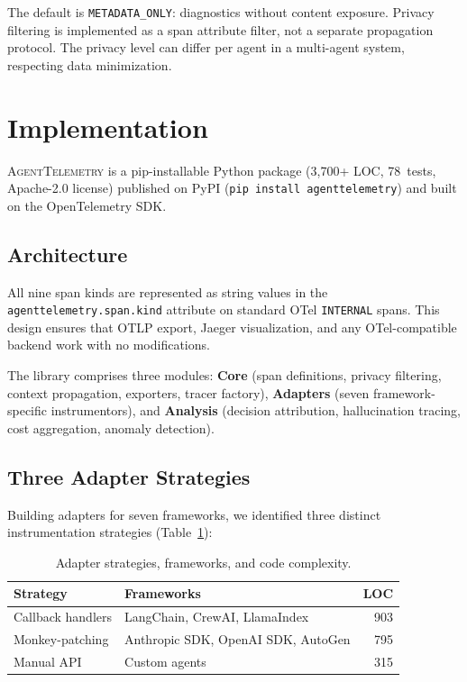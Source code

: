 \documentclass[sigplan,10pt,screen]{acmart}
\begin{document}
The default is \texttt{METADATA\_ONLY}: diagnostics without content
exposure.  Privacy filtering is implemented as a span attribute filter,
not a separate propagation protocol.  The privacy level can differ per
agent in a multi-agent system, respecting data minimization.

\section{Implementation}
\label{sec:implementation}

\textsc{AgentTelemetry} is a pip-installable Python package (3{,}700+
LOC, 78~tests, Apache-2.0 license) published on PyPI
(\texttt{pip install agenttelemetry}) and built on the OpenTelemetry SDK.

\subsection{Architecture}

All nine span kinds are represented as string values in the
\texttt{agenttelemetry.span.kind} attribute on standard OTel
\texttt{INTERNAL} spans.  This design ensures that OTLP export,
Jaeger visualization, and any OTel-compatible backend work with no
modifications.

The library comprises three modules: \textbf{Core} (span definitions,
privacy filtering, context propagation, exporters, tracer factory),
\textbf{Adapters} (seven framework-specific instrumentors), and
\textbf{Analysis} (decision attribution, hallucination tracing, cost
aggregation, anomaly detection).

\subsection{Three Adapter Strategies}

Building adapters for seven frameworks, we identified three distinct
instrumentation strategies (Table~\ref{tab:adapters}):

\begin{table}[t]
\centering
\small
\caption{Adapter strategies, frameworks, and code complexity.}
\label{tab:adapters}
\begin{tabular}{@{}llr@{}}
\toprule
\textbf{Strategy} & \textbf{Frameworks} & \textbf{LOC} \\
\midrule
Callback handlers & LangChain, CrewAI, LlamaIndex & 903 \\
Monkey-patching   & Anthropic SDK, OpenAI SDK, AutoGen & 795 \\
Manual API        & Custom agents & 315 \\
\bottomrule
\end{tabular}
\end{table}
\end{document}
